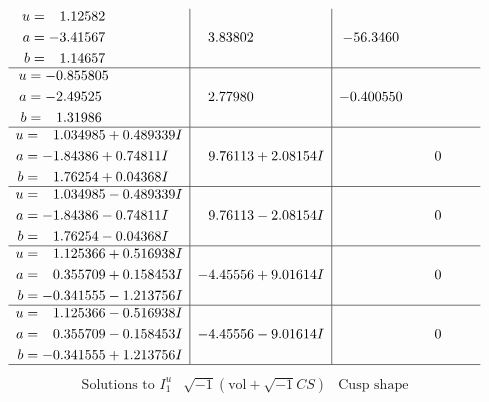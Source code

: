 \documentclass[1p]{elsarticle_modified}
\theoremstyle{definition}
\newcommand{\I}{\sqrt{-1}}
\begin{document}
$$\begin{array}{c|c|c}
\begin{aligned}
u &= \phantom{-}1.12582\phantom{ +0.000000I} \\
a &= -3.41567\phantom{ +0.000000I} \\
b &= \phantom{-}1.14657\phantom{ +0.000000I}\end{aligned}
 & \phantom{-}3.83802\phantom{ +0.000000I} & -56.3460\phantom{ +0.000000I} \\ \hline\begin{aligned}
u &= -0.855805\phantom{ +0.000000I} \\
a &= -2.49525\phantom{ +0.000000I} \\
b &= \phantom{-}1.31986\phantom{ +0.000000I}\end{aligned}
 & \phantom{-}2.77980\phantom{ +0.000000I} & -0.400550\phantom{ +0.000000I} \\ \hline\begin{aligned}
u &= \phantom{-}1.034985 + 0.489339 I \\
a &= -1.84386 + 0.74811 I \\
b &= \phantom{-}1.76254 + 0.04368 I\end{aligned}
 & \phantom{-}9.76113 + 2.08154 I & \phantom{-0.000000 } 0 \\ \hline\begin{aligned}
u &= \phantom{-}1.034985 - 0.489339 I \\
a &= -1.84386 - 0.74811 I \\
b &= \phantom{-}1.76254 - 0.04368 I\end{aligned}
 & \phantom{-}9.76113 - 2.08154 I & \phantom{-0.000000 } 0 \\ \hline\begin{aligned}
u &= \phantom{-}1.125366 + 0.516938 I \\
a &= \phantom{-}0.355709 + 0.158453 I \\
b &= -0.341555 - 1.213756 I\end{aligned}
 & -4.45556 + 9.01614 I & \phantom{-0.000000 } 0 \\ \hline\begin{aligned}
u &= \phantom{-}1.125366 - 0.516938 I \\
a &= \phantom{-}0.355709 - 0.158453 I \\
b &= -0.341555 + 1.213756 I\end{aligned}
 & -4.45556 - 9.01614 I & \phantom{-0.000000 } 0\\
 \hline 
 \end{array}$$\newpage$$\begin{array}{c|c|c}  
\text{Solutions to }I^u_{1}& \I (\text{vol} + \sqrt{-1}CS) & \text{Cusp shape}\\

\end{array}$$
\end{document}
